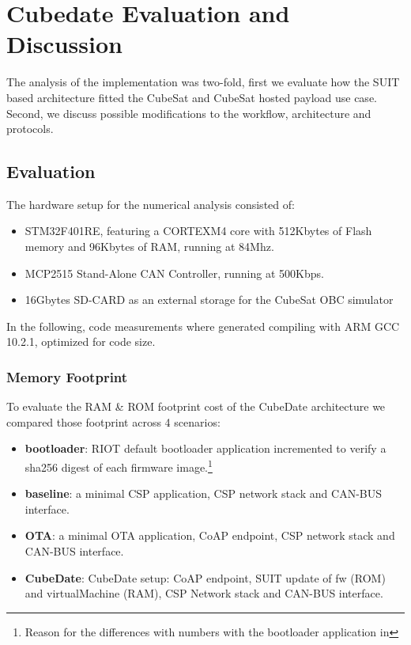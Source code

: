 \section{Cubedate Evaluation and Discussion}
\label{sec:evaluation}

The analysis of the implementation was two-fold, first we evaluate how the SUIT
based architecture fitted the CubeSat and CubeSat hosted payload use case.
Second, we discuss possible modifications to the workflow, architecture and
protocols.

\subsection{Evaluation}

The hardware setup for the numerical analysis consisted of:

\begin{itemize}
    \item STM32F401RE, featuring a CORTEX\-M4 core with 512Kbytes of Flash memory
          and 96Kbytes of RAM, running at 84Mhz.
    \item MCP2515 Stand-Alone CAN Controller, running at 500Kbps.
    \item 16Gbytes SD-CARD as an external storage for the CubeSat OBC simulator
\end{itemize}

In the following, code measurements where generated compiling with ARM GCC 10.2.1,
optimized for code size.

\subsubsection{Memory Footprint}

To evaluate the RAM \& ROM footprint cost of the CubeDate architecture we compared
those footprint across 4 scenarios:

\begin{itemize}
    \item \textbf{bootloader}: RIOT default bootloader application incremented to
    verify a sha256 digest of each firmware image.\footnote{Reason for the differences
    with numbers with the bootloader application in\cite{zandberg2019secure}}
    \item \textbf{baseline}: a minimal CSP application, CSP network stack and CAN-BUS
    interface.
    \item \textbf{OTA}: a minimal OTA application, CoAP endpoint, CSP network stack
    and CAN-BUS interface.
    \item \textbf{CubeDate}: CubeDate setup: CoAP endpoint, SUIT update of fw (ROM)
    and virtualMachine (RAM), CSP Network stack and CAN-BUS interface.
\end{itemize}

